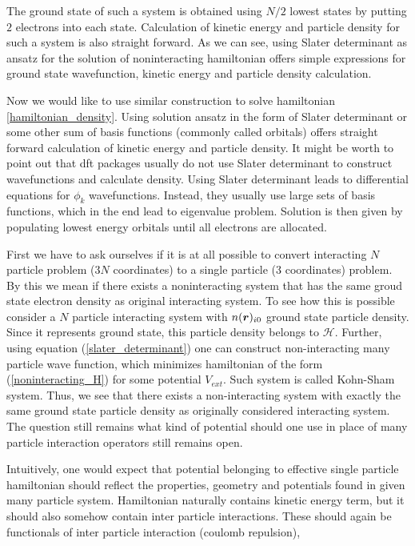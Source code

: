 \documentclass[openany, longbibliography,slovene,a4paper,12pt]{article}
\def\vec#1{\mbox{\boldmath$#1$}}
\begin{document}
 The ground state of such a system is obtained using $N/2$ lowest states by
 putting $2$  electrons into each state. Calculation of kinetic energy and particle
 density for such a system is also straight forward. As we can see, using Slater
 determinant as ansatz for the solution of noninteracting hamiltonian offers
 simple expressions for ground state wavefunction, kinetic energy and particle density
 calculation.  

Now we would like to use similar construction to solve hamiltonian
\ref{hamiltonian_density}. Using solution ansatz in the form of Slater
determinant or some other sum of basis functions (commonly called orbitals) offers straight forward
calculation of kinetic energy and  particle density. It might be worth to point
out that dft packages usually do not use Slater determinant to construct
wavefunctions and calculate density. Using Slater determinant leads to
differential equations for $\phi_k$ wavefunctions. Instead, they usually use
large sets of basis functions, which in the end lead to eigenvalue problem.
Solution is then given by populating lowest energy orbitals until all electrons
are allocated. 
 

First we have to ask ourselves if it is at all possible to convert interacting
$N$ particle problem ($3N$ coordinates) to a single particle (3 coordinates)
problem. By this we mean if there exists a noninteracting system that has the
same groud state electron density as original interacting system.
To see how this is possible consider a $N$ particle interacting system
with $n(\vec r)_{i0}$ ground state particle density. Since it represents ground
state,  this particle density belongs to $\mathcal H$. Further, using equation
(\ref{slater_determinant}) one can construct non-interacting many particle wave
function, which minimizes hamiltonian of the form (\ref{noninteracting_H})
for some potential $V_{ext}$. Such system is called Kohn-Sham system.
Thus, we see that there exists a non-interacting system with exactly the same ground state particle density as originally
considered interacting system. The question still remains what kind of potential
should one use in place of many particle interaction operators still remains
open.

Intuitively, one would expect that potential belonging to effective single
particle hamiltonian should reflect the properties, geometry and potentials found
in given many particle system. Hamiltonian naturally contains kinetic energy
term, but it should also somehow contain inter particle interactions. These
should again be functionals of inter particle interaction (coulomb repulsion), 
\end{document}
